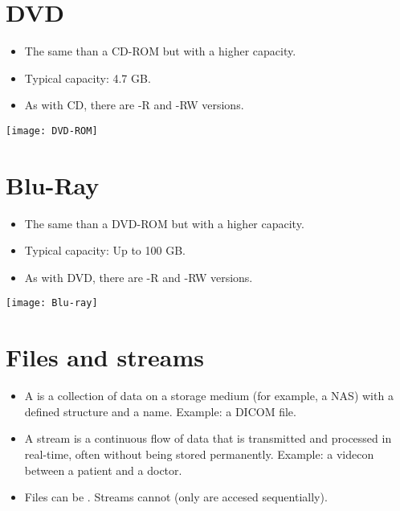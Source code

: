 \section{\gls{DVD}}
\begin{itemize}
\item The same than a \gls{CD-ROM} but with a higher capacity.
\item Typical capacity: 4.7 GB.
\item As with \gls{CD}, there are -R and -RW versions.
\end{itemize}
\vspace{-4ex}
\begin{center}
  \texttt{[image: DVD-ROM]}
\end{center}

\section{Blu-Ray}
\begin{itemize}
\item The same than a \gls{DVD-ROM} but with a higher capacity.
\item Typical capacity: Up to 100 GB.
\item As with \gls{DVD}, there are -R and -RW versions.
\end{itemize}
\vspace{-4ex}
\begin{center}
  \texttt{[image: Blu-ray]}
\end{center}

\section{Files and streams}
\begin{itemize}
\item A  is a collection of data  on a storage
medium (for example, a NAS) with a defined structure and a
name. Example: a DICOM file.
\item A stream is a continuous flow of data that is transmitted and
processed in real-time, often without being stored
permanently. Example: a videcon between a patient and a doctor.
\item Files can be . Streams cannot (only are accesed
sequentially).
\end{itemize}

